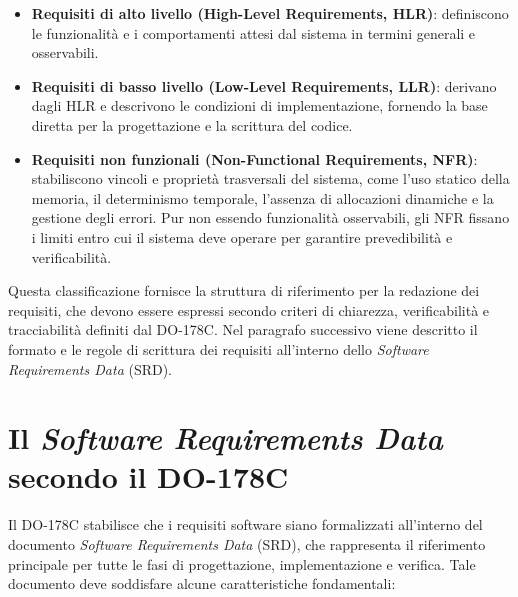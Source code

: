 \documentclass[italian, Lau, oneside]{sapthesis} %
\begin{document}
\begin{itemize}
    \item \textbf{Requisiti di alto livello (High-Level Requirements, HLR)}: definiscono le funzionalità e i comportamenti attesi dal sistema in termini generali e osservabili.
    \item \textbf{Requisiti di basso livello (Low-Level Requirements, LLR)}: derivano dagli HLR e descrivono le condizioni di implementazione, fornendo la base diretta per la progettazione e la scrittura del codice.
    \item \textbf{Requisiti non funzionali (Non-Functional Requirements, NFR)}: stabiliscono vincoli e proprietà trasversali del sistema, come l’uso statico della memoria, il determinismo temporale, l’assenza di allocazioni dinamiche e la gestione degli errori. Pur non essendo funzionalità osservabili, gli NFR fissano i limiti entro cui il sistema deve operare per garantire prevedibilità e verificabilità.
\end{itemize}

Questa classificazione fornisce la struttura di riferimento per la redazione dei requisiti, che devono essere espressi secondo criteri di chiarezza, verificabilità e tracciabilità definiti dal DO-178C.
Nel paragrafo successivo viene descritto il formato e le regole di scrittura dei requisiti all’interno dello \emph{Software Requirements Data} (SRD). 

\section{Il \emph{Software Requirements Data} secondo il DO-178C}

Il DO-178C stabilisce che i requisiti software siano formalizzati all’interno del documento \emph{Software Requirements Data} (SRD), che rappresenta il riferimento principale per tutte le fasi di progettazione, implementazione e verifica.  
Tale documento deve soddisfare alcune caratteristiche fondamentali:
\end{document}
